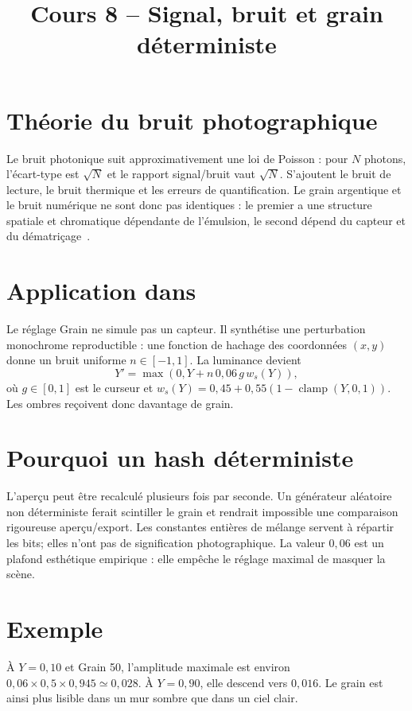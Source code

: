 
\title{Cours 8 -- Signal, bruit et grain déterministe}


\section{Théorie du bruit photographique}
Le bruit photonique suit approximativement une loi de Poisson : pour $N$ photons, l'écart-type est $\sqrt{N}$ et le rapport signal/bruit vaut $\sqrt{N}$. S'ajoutent le bruit de lecture, le bruit thermique et les erreurs de quantification. Le grain argentique et le bruit numérique ne sont donc pas identiques : le premier a une structure spatiale et chromatique dépendante de l'émulsion, le second dépend du capteur et du dématriçage~\cite{gonzalezWoods}.

\section{Application dans \IPR{}}
Le réglage Grain ne simule pas un capteur. Il synthétise une perturbation monochrome reproductible : une fonction de hachage des coordonnées $(x,y)$ donne un bruit uniforme $n\in[-1,1]$. La luminance devient
\begin{equation}
Y'=\max(0,Y+n\,0{,}06\,g\,w_s(Y)),
\end{equation}
où $g\in[0,1]$ est le curseur et $w_s(Y)=0{,}45+0{,}55(1-\operatorname{clamp}(Y,0,1))$. Les ombres reçoivent donc davantage de grain.

\section{Pourquoi un hash déterministe}
L'aperçu peut être recalculé plusieurs fois par seconde. Un générateur aléatoire non déterministe ferait scintiller le grain et rendrait impossible une comparaison rigoureuse aperçu/export. Les constantes entières de mélange servent à répartir les bits; elles n'ont pas de signification photographique. La valeur $0{,}06$ est un plafond esthétique empirique : elle empêche le réglage maximal de masquer la scène.

\section{Exemple}
À $Y=0{,}10$ et Grain 50, l'amplitude maximale est environ $0{,}06\times0{,}5\times0{,}945\simeq0{,}028$. À $Y=0{,}90$, elle descend vers $0{,}016$. Le grain est ainsi plus lisible dans un mur sombre que dans un ciel clair.

